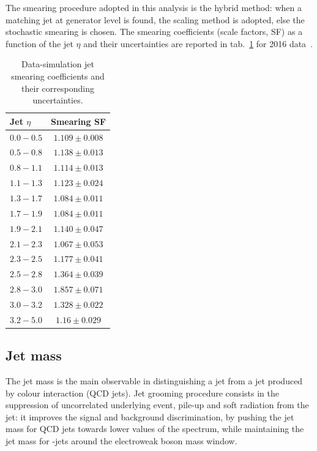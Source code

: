 \noindent The smearing procedure adopted in this analysis is the hybrid method: when a matching jet at generator level is found, the scaling method is adopted, else the stochastic smearing is chosen. The smearing coefficients (scale factors, SF) as a function of the jet $\eta$ and their uncertainties are reported in tab.~\ref{tab:smear} for 2016 data~\cite{CMS-DP-2016-020}.

\begin{table}[!htb]
  \centering
  \caption{Data-simulation jet smearing coefficients and their corresponding uncertainties.}
  \begin{tabular}{l|c}
    Jet $\eta$ & Smearing SF \\
    \hline
    \hline
    $0.0-0.5$ & $1.109 \pm 0.008$ \\
    $0.5-0.8$ & $1.138 \pm 0.013$ \\
    $0.8-1.1$ & $1.114 \pm 0.013$ \\
    $1.1-1.3$ & $1.123 \pm 0.024$ \\
    $1.3-1.7$ & $1.084 \pm 0.011$ \\
    $1.7-1.9$ & $1.084 \pm 0.011$ \\
    $1.9-2.1$ & $1.140 \pm 0.047$ \\
    $2.1-2.3$ & $1.067 \pm 0.053$ \\
    $2.3-2.5$ & $1.177 \pm 0.041$ \\
    $2.5-2.8$ & $1.364 \pm 0.039$ \\
    $2.8-3.0$ & $1.857 \pm 0.071$ \\
    $3.0-3.2$ & $1.328 \pm 0.022$ \\
    $3.2-5.0$ & $1.16  \pm 0.029$ \\
  \end{tabular}
  

  \label{tab:smear}
\end{table}

\subsection{Jet mass}\label{ssec:jetmass}

The jet mass is the main observable in distinguishing a \V jet from a jet produced by colour interaction (QCD jets). Jet grooming procedure consists in the suppression of uncorrelated underlying event, pile-up and soft radiation from the jet: it improves the signal and background discrimination, by pushing the jet mass for QCD jets towards lower values of the spectrum, while maintaining the jet mass for \V-jets around the electroweak boson mass window.

